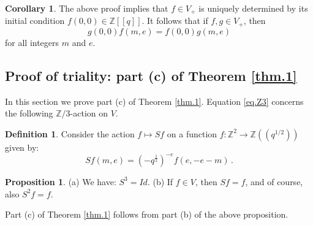 \documentclass[12pt]{amsart}
\theoremstyle{definition}
\newtheorem{proposition}[theorem]{Proposition}
\newtheorem{definition}[theorem]{Definition}
\newtheorem{corollary}[theorem]{Corollary}
\def\BZ{\mathbb Z}
\def\longto{\longrightarrow}
\def\be{  \begin{equation} }
\def\ee{  \end{equation} }
\numberwithin{equation}{section}
\begin{document}
\begin{corollary}
\label{cor.V+}
The above proof implies that $f \in V_+$ is uniquely determined by
its initial condition $f(0,0) \in \BZ[[q]]$. It follows that if 
$f,g \in V_+$, then
\be
\label{eq.fg00}
g(0,0)f(m,e)=f(0,0)g(m,e)
\ee
for all integers $m$ and $e$.
\end{corollary}


\subsection{Proof of triality: part (c) of Theorem \ref{thm.1}}
\label{sub.prop.S3}

In this section we prove part (c) of Theorem \ref{thm.1}. Equation 
\eqref{eq.Z3} concerns the following $\BZ/3$-action on $V$.


\begin{definition}
\label{def.Sf}
Consider the action $f \mapsto Sf$ on a function 
$f: \BZ^2 \longto \BZ((q^{1/2}))$ given by:
\be
\label{eq.Sf}
Sf(m,e)=(-q^{\frac{1}{2}})^{-e} f(e,-e-m) \,.
\ee
\end{definition}

\begin{proposition}
\label{prop.S3}
\rm{(a)} We have: $S^3=Id$.
\newline
\rm{(b)} If $f \in V$, then $Sf=f$, and of course, also $S^2f=f$.
\end{proposition}
Part (c) of Theorem \ref{thm.1} follows from part (b) of the above
proposition.
\end{document}
